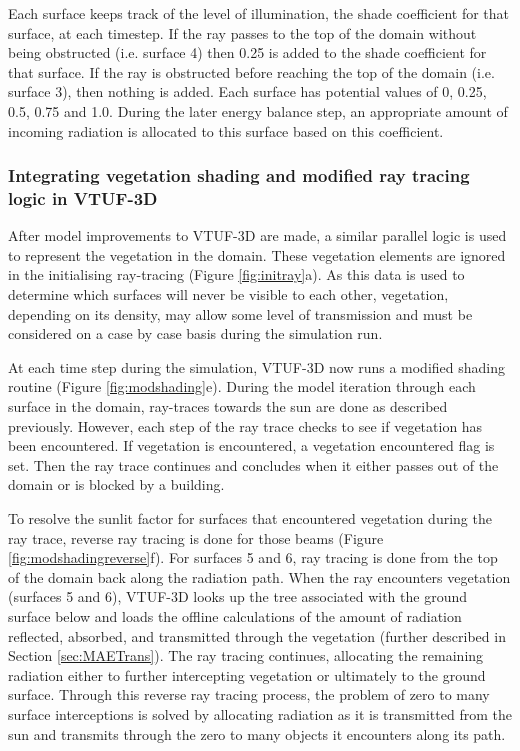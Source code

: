 \documentclass[final,3p,times,authoryear]{elsarticle}
\begin{document}
Each surface keeps track of the level of illumination, the shade coefficient for that surface, at each timestep. If the ray passes to the top of the domain without being obstructed (i.e. surface 4) then 0.25 is added to the shade coefficient for that surface. If the ray is obstructed before reaching the top of the domain (i.e. surface 3), then nothing is added. Each surface has potential values of 0, 0.25, 0.5, 0.75 and 1.0. During the later energy balance step, an appropriate amount of incoming radiation is allocated to this surface based on this coefficient.

\subsubsection{Integrating vegetation shading and modified ray tracing logic in VTUF-3D}\label{sec:Representationofvegetation}

After model improvements to VTUF-3D are made, a similar parallel logic is used to represent the vegetation in the domain. These vegetation elements are ignored in the initialising ray-tracing (Figure \ref{fig:initray}a). As this data is used to determine which surfaces will never be visible to each other, vegetation, depending on its density, may allow some level of transmission and must be considered on a case by case basis during the simulation run.

At each time step during the simulation, VTUF-3D now runs a modified shading routine (Figure \ref{fig:modshading}e). During the model iteration through each surface in the domain, ray-traces towards the sun are done as described previously. However, each step of the ray trace checks to see if vegetation has been encountered. If vegetation is encountered, a vegetation encountered flag is set. Then the ray trace continues and concludes when it either passes out of the domain or is blocked by a building. 

To resolve the sunlit factor for surfaces that encountered vegetation during the ray trace, reverse ray tracing is done for those beams (Figure \ref{fig:modshadingreverse}f). For surfaces 5 and 6, ray tracing is done from the top of the domain back along the radiation path. When the ray encounters vegetation (surfaces 5 and 6), VTUF-3D looks up the tree associated with the ground surface below and loads the offline calculations of the amount of radiation reflected, absorbed, and transmitted through the vegetation (further described in Section \ref{sec:MAETrans}). The ray tracing continues, allocating the remaining radiation either to further intercepting vegetation or ultimately to the ground surface. Through this reverse ray tracing process, the problem of zero to many surface interceptions is solved by allocating radiation as it is transmitted from the sun and transmits through the zero to many objects it encounters along its path. 
\end{document}

